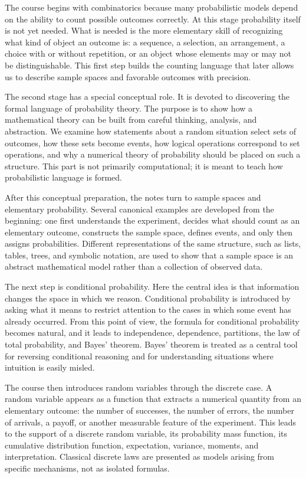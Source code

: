 The course begins with combinatorics because many probabilistic models depend on the ability to count possible outcomes correctly. At this stage probability itself is not yet needed. What is needed is the more elementary skill of recognizing what kind of object an outcome is: a sequence, a selection, an arrangement, a choice with or without repetition, or an object whose elements may or may not be distinguishable. This first step builds the counting language that later allows us to describe sample spaces and favorable outcomes with precision.

The second stage has a special conceptual role. It is devoted to discovering the formal language of probability theory. The purpose is to show how a mathematical theory can be built from careful thinking, analysis, and abstraction. We examine how statements about a random situation select sets of outcomes, how these sets become events, how logical operations correspond to set operations, and why a numerical theory of probability should be placed on such a structure. This part is not primarily computational; it is meant to teach how probabilistic language is formed.

After this conceptual preparation, the notes turn to sample spaces and elementary probability. Several canonical examples are developed from the beginning: one first understands the experiment, decides what should count as an elementary outcome, constructs the sample space, defines events, and only then assigns probabilities. Different representations of the same structure, such as lists, tables, trees, and symbolic notation, are used to show that a sample space is an abstract mathematical model rather than a collection of observed data.

The next step is conditional probability. Here the central idea is that information changes the space in which we reason. Conditional probability is introduced by asking what it means to restrict attention to the cases in which some event has already occurred. From this point of view, the formula for conditional probability becomes natural, and it leads to independence, dependence, partitions, the law of total probability, and Bayes' theorem. Bayes' theorem is treated as a central tool for reversing conditional reasoning and for understanding situations where intuition is easily misled.

The course then introduces random variables through the discrete case. A random variable appears as a function that extracts a numerical quantity from an elementary outcome: the number of successes, the number of errors, the number of arrivals, a payoff, or another measurable feature of the experiment. This leads to the support of a discrete random variable, its probability mass function, its cumulative distribution function, expectation, variance, moments, and interpretation. Classical discrete laws are presented as models arising from specific mechanisms, not as isolated formulas.

